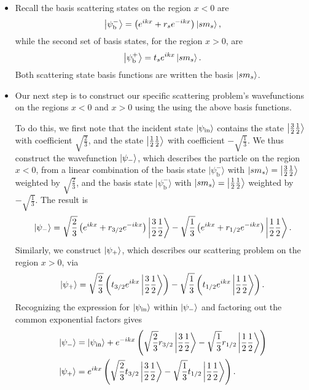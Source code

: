 \documentclass[11pt, a4paper]{article}
\newcommand{\p}{\psi}  %
\newcommand{\bket}[1]{\big | {#1} \big \rangle}  %
\begin{document}
\begin{itemize}
	\item Recall the basis scattering states on the region $ x < 0 $ are
	\begin{equation*}
		\bket{\psi_{\text{b}}^{-}} = \left(e^{ik x} + r_{s}e^{-ik x}\right)\ket{sm_{s}},
	\end{equation*}
	while the second set of basis states, for the region $ x > 0 $, are
	\begin{equation*}
		\bket{\psi_{\text{b}}^{+}} = t_{s} e^{ikx}\ket{sm_{s}}.
	\end{equation*}
	Both scattering state basis functions are written the basis $ \ket{sm_{s}} $.
	
	\item Our next step is to construct our specific scattering problem's wavefunctions on the regions $ x < 0 $ and $ x > 0 $ using the using the above basis functions. 
	
	To do this, we first note that the incident state $ \ket{\psi_{\text{in}}} $ contains the state $ \ket{\tfrac{3}{2}\tfrac{1}{2}} $ with coefficient $ \sqrt{\tfrac{2}{3}} $, and the state $ \ket{\tfrac{1}{2}\tfrac{1}{2}} $ with coefficient $ -\sqrt{\tfrac{1}{3}} $. We thus construct the wavefunction $ \ket{\psi_{-}} $, which describes the particle on the region $ x < 0 $, from a linear combination of the basis state $ \bket{\psi_{\text{b}}^{-}} $ with $ \ket{sm_{s}} = \ket{\tfrac{3}{2}\tfrac{1}{2}} $ weighted by $  \sqrt{\tfrac{2}{3}}  $, and the basis state $ \bket{\psi_{\text{b}}^{-}} $ with $ \ket{sm_{s}} = \ket{\tfrac{1}{2}\tfrac{1}{2}}  $ weighted by $ -\sqrt{\tfrac{1}{3}}  $. The result is 
	\begin{equation*}
		\ket{\psi_{-}} = \sqrt{\frac{2}{3}}\left(e^{ikx} + r_{3/2}e^{-ikx}\right)\ket{\frac{3}{2}\frac{1}{2}} - \sqrt{\frac{1}{3}}\left(e^{ikx} + r_{1/2}e^{-ikx}\right)\ket{\frac{1}{2}\frac{1}{2}}.
	\end{equation*}
	Similarly, we construct $ \ket{\psi_{\text{+}}} $, which describes our scattering problem on the region $ x > 0 $, via
	\begin{equation*}
		\ket{\psi_{+}} = \sqrt{\frac{2}{3}}\left(t_{3/2}e^{ikx}\ket{\frac{3}{2}\frac{1}{2}}\right) - \sqrt{\frac{1}{3}}\left(t_{1/2}e^{ikx}\ket{\frac{1}{2}\frac{1}{2}} \right).
	\end{equation*}
	Recognizing the expression for $ \ket{\psi_{\text{in}}} $ within $ \ket{\psi_{-}} $ and factoring out the common exponential factors gives
	\begin{align*}
		&\ket{\psi_{-}}= \ket{\psi_{\text{in}}} + e^{-ikx}\left( \sqrt{\frac{2}{3}} r_{3/2}\ket{\frac{3}{2}\frac{1}{2}} - \sqrt{\frac{1}{3}} r_{1/2}\ket{\frac{1}{2}\frac{1}{2}} \right)\\
		&\ket{\psi_{+}} = 	e^{ikx}\left(\sqrt{\frac{2}{3}}t_{3/2}\ket{\frac{3}{2}\frac{1}{2}} - \sqrt{\frac{1}{3}}t_{1/2}\ket{\frac{1}{2}\frac{1}{2}}\right).
	\end{align*}
	

\end{itemize}
\end{document}
